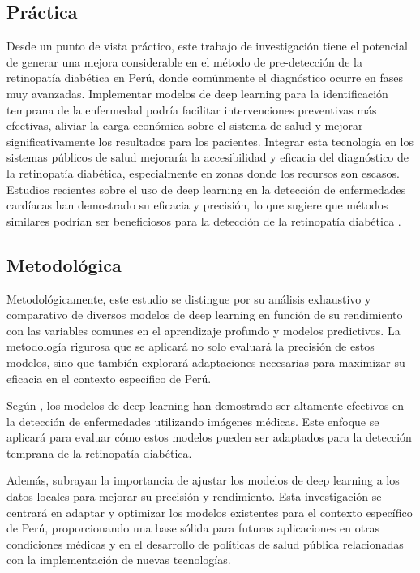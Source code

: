 \subsection{Práctica}
Desde un punto de vista práctico, este trabajo de investigación tiene el potencial de generar una mejora considerable en el método de pre-detección de la retinopatía diabética en Perú, donde comúnmente el diagnóstico ocurre en fases muy avanzadas. Implementar modelos de deep learning para la identificación temprana de la enfermedad podría facilitar intervenciones preventivas más efectivas, aliviar la carga económica sobre el sistema de salud y mejorar significativamente los resultados para los pacientes. Integrar esta tecnología en los sistemas públicos de salud mejoraría la accesibilidad y eficacia del diagnóstico de la retinopatía diabética, especialmente en zonas donde los recursos son escasos. Estudios recientes sobre el uso de deep learning en la detección de enfermedades cardíacas han demostrado su eficacia y precisión, lo que sugiere que métodos similares podrían ser beneficiosos para la detección de la retinopatía diabética \cite{rajeswari2022heart, arulkumar2023monitoring}.


\subsection{Metodológica}
Metodológicamente, este estudio se distingue por su análisis exhaustivo y comparativo de diversos modelos de deep learning en función de su rendimiento con las variables comunes en el aprendizaje profundo y modelos predictivos. La metodología rigurosa que se aplicará no solo evaluará la precisión de estos modelos, sino que también explorará adaptaciones necesarias para maximizar su eficacia en el contexto específico de Perú.

Según \citet{sharma2020deep}, los modelos de deep learning han demostrado ser altamente efectivos en la detección de enfermedades utilizando imágenes médicas. Este enfoque se aplicará para evaluar cómo estos modelos pueden ser adaptados para la detección temprana de la retinopatía diabética.

Además, \citet{jiang2020heart} subrayan la importancia de ajustar los modelos de deep learning a los datos locales para mejorar su precisión y rendimiento. Esta investigación se centrará en adaptar y optimizar los modelos existentes para el contexto específico de Perú, proporcionando una base sólida para futuras aplicaciones en otras condiciones médicas y en el desarrollo de políticas de salud pública relacionadas con la implementación de nuevas tecnologías.





